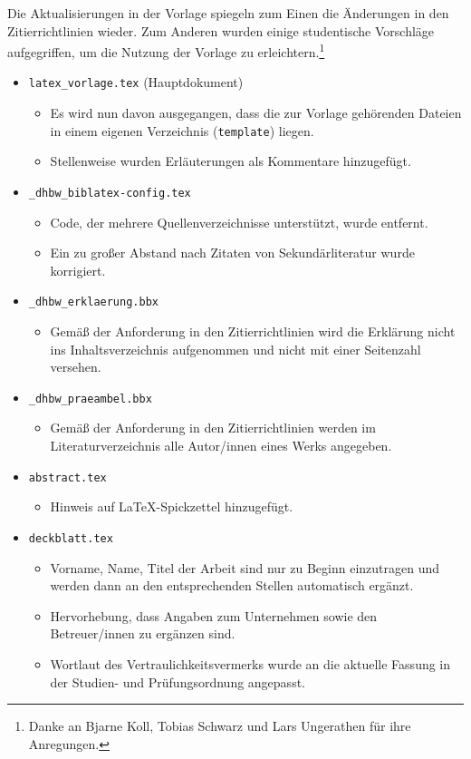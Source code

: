 Die Aktualisierungen in der Vorlage spiegeln zum Einen die Änderungen in den Zitierrichtlinien wieder. Zum Anderen wurden einige studentische Vorschläge aufgegriffen, um die Nutzung der Vorlage zu erleichtern.\footnote{Danke an Bjarne Koll, Tobias Schwarz und Lars Ungerathen für ihre Anregungen.} 

\begin{itemize}

\item \verb|latex_vorlage.tex| (Hauptdokument)
\begin{itemize}
\item Es wird nun davon ausgegangen, dass die zur Vorlage gehörenden Dateien in einem eigenen Verzeichnis (\verb|template|) liegen.
\item Stellenweise wurden Erläuterungen als Kommentare hinzugefügt.
\end{itemize}

\item \verb|_dhbw_biblatex-config.tex|
\begin{itemize}
\item Code, der mehrere Quellenverzeichnisse unterstützt, wurde entfernt.
\item Ein zu großer Abstand nach Zitaten von Sekundärliteratur wurde korrigiert. 
\end{itemize}

\item \verb|_dhbw_erklaerung.bbx|
\begin{itemize}
\item Gemäß der Anforderung in den Zitierrichtlinien wird die Erklärung nicht ins Inhaltsverzeichnis aufgenommen und nicht mit einer Seitenzahl versehen. 
\end{itemize}

\pagebreak
\item \verb|_dhbw_praeambel.bbx|
\begin{itemize}
\item Gemäß der Anforderung in den Zitierrichtlinien werden im Literaturverzeichnis alle Autor/innen eines Werks angegeben.
\end{itemize}

\item \verb|abstract.tex|
\begin{itemize}
\item Hinweis auf \LaTeX-Spickzettel hinzugefügt.
\end{itemize}

\item \verb|deckblatt.tex|
\begin{itemize}
\item Vorname, Name, Titel der Arbeit sind nur zu Beginn einzutragen und werden dann an den entsprechenden Stellen automatisch ergänzt.
\item Hervorhebung, dass Angaben zum Unternehmen sowie den Betreuer/innen zu ergänzen sind. 
\item Wortlaut des Vertraulichkeitsvermerks wurde an die aktuelle Fassung in der Studien- und Prüfungsordnung angepasst. 
\end{itemize}


\end{itemize}
